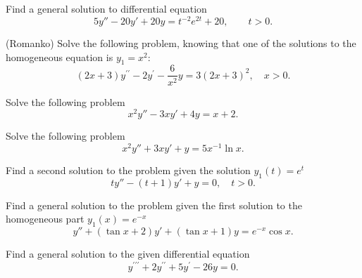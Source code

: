 \documentclass[11pt]{article}
\begin{document}
\begin{problem}
Find a general solution to differential equation
\begin{equation*}
5y'' -20 y' +20 y = t^{-2}e^{2t}+20, \qquad t>0.
\end{equation*}
\end{problem}


\begin{problem}
(Romanko) Solve the following problem, knowing that one of the solutions to
the homogeneous equation is $y_1 = x^2$:
\begin{equation*}     
  \left( 2x + 3 \right) y^{\prime \prime} - 2 y^{\prime} - \frac {6} {x^2} y
  = 3 \left( 2x + 3 \right)^2, \quad x>0.
\end{equation*}
\end{problem}






\begin{problem}
Solve the following problem
\begin{equation*}
     x^{2}y''-3xy'+4y=x+2.
\end{equation*}
\end{problem}


\begin{problem}
Solve the following problem
\begin{equation*}     
     x^{2}y''+3xy'+y=5x^{-1}\ln x.
\end{equation*}
\end{problem}



\begin{problem}
Find a second solution to the problem given the solution $y_{1}(t)=e^{t}$
\begin{equation*}
ty''-(t+1)y'+y=0, \quad t>0.
\end{equation*}
\end{problem}


\begin{problem}
Find a general solution to the problem given the first solution to the homogeneous part $y_{1}(x)=e^{-x}$
\begin{equation*}
y''+(\tan x +2)y'+(\tan x+1)y=e^{-x}\cos x.
\end{equation*}
\end{problem}


\begin{problem}
Find a general solution to the given differential equation
\begin{equation*}
y^{\prime \prime \prime}+2y^{\prime \prime} + 5 y^{\prime} -26 y =0.
\end{equation*}
\end{problem}
\end{document}
